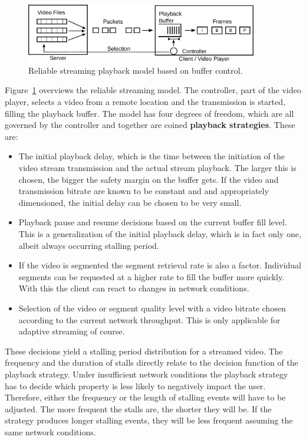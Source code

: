 \begin{figure}[htb]
	\centering
	\includegraphics[width=0.9\textwidth]{images/playback-model.pdf}
	\caption{Reliable streaming playback model based on buffer control.}
\label{c3:fig:playback-model}
\end{figure}

Figure~\ref{c3:fig:playback-model} overviews the reliable streaming model. The controller, part of the video player, selects a video from a remote location and the transmission is started, filling the playback buffer. The model has four degrees of freedom, which are all governed by the controller and together are coined \textbf{playback strategies}. These are:

\begin{itemize}
	\item The initial playback delay, which is the time between the initiation of the video stream transmission and the actual stream playback. The larger this is chosen, the bigger the safety margin on the buffer gets. If the video and transmission bitrate are known to be constant and and appropriately dimensioned, the initial delay can be chosen to be very small.

	\item Playback pause and resume decisions based on the current buffer fill level. This is a generalization of the initial playback delay, which is in fact only one, albeit always occurring stalling period.

	\item If the video is segmented the segment retrieval rate is also a factor. Individual segments can be requested at a higher rate to fill the buffer more quickly. With this the client can react to changes in network conditions.

	\item Selection of the video or segment quality level with a video bitrate chosen according to the current network throughput. This is only applicable for adaptive streaming of course.
\end{itemize}


These decisions yield a stalling period distribution for a streamed video. The frequency and the duration of stalls directly relate to the decision function of the playback strategy. Under insufficient network conditions the playback strategy has to decide which property is less likely to negatively impact the user. Therefore, either the frequency or the length of stalling events will have to be adjusted. The more frequent the stalls are, the shorter they will be. If the strategy produces longer stalling events, they will be less frequent assuming the same network conditions.

